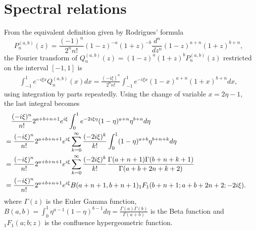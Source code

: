 \section{Spectral relations}

From the equivalent definition given by Rodrigues' formula
\[
  P_{n}^{(a,b)}(z) = \frac{(-1)^n}{2^nn!} (1-z)^{-a}(1+z)^{-b}
  \frac{d^n}{dz^n} (1-z)^{a+n}(1+z)^{b+n},
\]
the Fourier transform of $Q_n^{(a,b)}(z) = (1-z)^a(1+z)^bP_n^{(a,b)}(z)$
restricted on the interval $[-1,1]$ is 
\begin{align*}
  \int_{-1}^1 e^{-i\xi x} Q_n^{(a,b)}(x)dx
  = \frac{(-i\xi)^n}{2^nn!}\int_{-1}^1 e^{-i\xi x} (1-x)^{a+n}(1+x)^{b+n}dx,
\end{align*}
using integration by parts repeatedly. Using the change of variable $x = 2\eta-1$, the last 
integral becomes 
\begin{align*}
  &\quad \frac{(-i\xi)^n}{n!} 2^{a+b+n+1}e^{i\xi}
  \int_0^1 e^{-2i\xi\eta}(1-\eta)^{a+n}\eta^{b+n} d\eta\cr
  &= \frac{(-i\xi)^n}{n!} 2^{a+b+n+1}e^{i\xi}\sum_{k=0}^\infty \frac{(-2i\xi)^k}{k!}
  \int_0^1 (1-\eta)^{a+b}\eta^{b+n+k}d\eta\cr
  &= 
  \frac{(-i\xi)^n}{n!} 2^{a+b+n+1}e^{i\xi}\sum_{k=0}^\infty \frac{(-2i\xi)^k}{k!}
  \frac{\Gamma(a+n+1)\Gamma(b+n+k+1)}{\Gamma(a+b+2n+k+2)} \cr
  &= \frac{(-i\xi)^n}{n!} 2^{a+b+n+1}e^{i\xi}B(a+n+1,b+n+1)
  { }_1F_1(b+n+1;a+b+2n+2;-2i\xi).
\end{align*}
where $\Gamma(z)$ is the Euler Gamma function, $B(a,b)=\int_0^1 \eta^{a-1}(1-\eta)^{b-1}d\eta
=\frac{\Gamma(a)\Gamma(b)}{\Gamma(a+b)}$ is the Beta function
and ${ }_1F_1(a;b;z)$ is the confluence hypergeometric function.
\begin{lem}
\end{lem}
